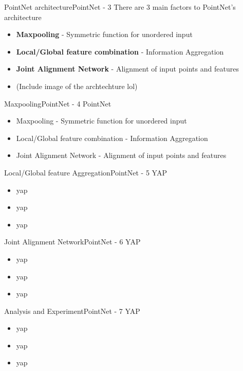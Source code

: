 \documentclass{beamer}
\begin{document}
		\begin{frame}{PointNet architecture}{PointNet - 3}
			There are 3 main factors to PointNet's architecture
			\begin{itemize}
				\item \textbf{Maxpooling} - Symmetric function for unordered input
				\item \textbf{Local/Global feature combination} - Information Aggregation
				\item \textbf{Joint Alignment Network} - Alignment of input points and features
				\item (Include image of the archtechture lol)
			\end{itemize}
		\end{frame}
		
		\begin{frame}{Maxpooling}{PointNet - 4}
			PointNet
			\begin{itemize}
				\item Maxpooling - Symmetric function for unordered input
				\item Local/Global feature combination - Information Aggregation
				\item Joint Alignment Network - Alignment of input points and features
			\end{itemize}
		\end{frame}

		\begin{frame}{Local/Global feature Aggregation}{PointNet - 5}
			YAP
			\begin{itemize}
				\item yap
				\item yap
				\item yap
			\end{itemize}
		\end{frame}
		
		\begin{frame}{Joint Alignment Network}{PointNet - 6}
			YAP
			\begin{itemize}
				\item yap
				\item yap
				\item yap
			\end{itemize}
		\end{frame}
		
		\begin{frame}{Analysis and Experiment}{PointNet - 7}
			YAP
			\begin{itemize}
				\item yap
				\item yap
				\item yap
			\end{itemize}
		\end{frame}
\end{document}
